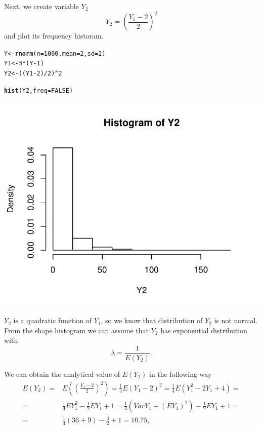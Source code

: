 \documentclass[12pt, a4paper]{article}\usepackage[]{graphicx}\usepackage[]{color}
\makeatletter
\def\maxwidth{ %
  \ifdim\Gin@nat@width>\linewidth
    \linewidth
  \else
    \Gin@nat@width
  \fi
}
\newcommand{\hlnum}[1]{\textcolor[rgb]{0.686,0.059,0.569}{#1}}%
\newcommand{\hlopt}[1]{\textcolor[rgb]{0,0,0}{#1}}%
\newcommand{\hlstd}[1]{\textcolor[rgb]{0.345,0.345,0.345}{#1}}%
\newcommand{\hlkwb}[1]{\textcolor[rgb]{0.69,0.353,0.396}{#1}}%
\newcommand{\hlkwc}[1]{\textcolor[rgb]{0.333,0.667,0.333}{#1}}%
\newcommand{\hlkwd}[1]{\textcolor[rgb]{0.737,0.353,0.396}{\textbf{#1}}}%
\newenvironment{kframe}{%
 \def\at@end@of@kframe{}%
 \ifinner\ifhmode%
  \def\at@end@of@kframe{\end{minipage}}%
  \begin{minipage}{\columnwidth}%
 \fi\fi%
 \def\FrameCommand##1{\hskip\@totalleftmargin \hskip-\fboxsep
 \colorbox{shadecolor}{##1}\hskip-\fboxsep
     \hskip-\linewidth \hskip-\@totalleftmargin \hskip\columnwidth}%
 \MakeFramed {\advance\hsize-\width
   \@totalleftmargin\z@ \linewidth\hsize
   \@setminipage}}%
 {\par\unskip\endMakeFramed%
 \at@end@of@kframe}
\newenvironment{knitrout}{}{} %
\makeatother
\begin{document}
Next, we create variable $Y_2$
\[ Y_2 = \left( \frac{Y_1-2}{2} \right)^2 \]
and plot its frequency historam.
\begin{knitrout}
\color{fgcolor}\begin{kframe}
\begin{alltt}
\hlstd{Y} \hlkwb{<-} \hlkwd{rnorm}\hlstd{(}\hlkwc{n} \hlstd{=} \hlnum{1000}\hlstd{,} \hlkwc{mean} \hlstd{=} \hlnum{2}\hlstd{,} \hlkwc{sd} \hlstd{=} \hlnum{2}\hlstd{)}
\hlstd{Y1} \hlkwb{<-} \hlnum{3} \hlopt{*} \hlstd{(Y} \hlopt{-} \hlnum{1}\hlstd{)}
\hlstd{Y2} \hlkwb{<-} \hlstd{((Y1} \hlopt{-} \hlnum{2}\hlstd{)} \hlopt{/} \hlnum{2}\hlstd{)} \hlopt{^} \hlnum{2}

\hlkwd{hist}\hlstd{(Y2,} \hlkwc{freq} \hlstd{=} \hlnum{FALSE}\hlstd{)}
\end{alltt}
\end{kframe}

{\centering \includegraphics[width=\maxwidth]{figure/ex1_2-1} 

}



\end{knitrout}

$Y_2$ is a quadratic function of $Y_1$, so we know that distribution of $Y_2$ is not normal. From the shape histogram we can assume that $Y_2$ has exponential distribution with 
\[\lambda = \frac{1}{E(Y_2)}.\]

We can obtain the analytical value of $E(Y_2)$ in the following way
\begin{align*}
E(Y_2)=& E\left(\left( \frac{Y_1-2}{2} \right)^2\right) = \frac{1}{4} E(Y_1-2)^2 = \frac{1}{4} E(Y_1^2 - 2Y_1 +4) =  \\ 
=& \frac{1}{4} EY_1^2 - \frac{1}{2} E Y_1 + 1= \frac{1}{4}\left(Var Y_1 +(E Y_1)^2\right)-\frac{1}{2} E Y_1 + 1 = \\
=& \frac{1}{4} (36 + 9) - \frac{3}{2} + 1 = 10.75,
\end{align*}
\end{document}
